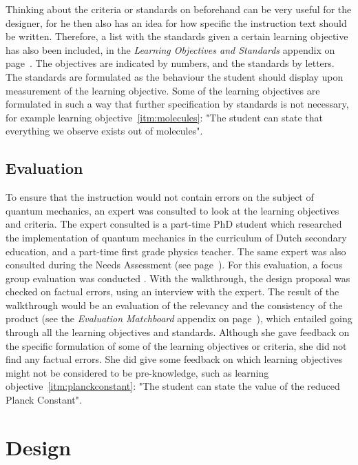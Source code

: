 \documentclass[11pt,twoside]{report} %
\begin{document}
Thinking about the criteria or standards on beforehand can be very useful for the designer, for he then also has an idea for how specific the instruction text should be written. Therefore, a list with the standards given a certain learning objective has also been included, in the \emph{Learning Objectives and Standards} appendix on page~\pageref{app:objectivestandards}. The objectives are indicated by numbers, and the standards by letters. The standards are formulated as the behaviour the student should display upon measurement of the learning objective. Some of the learning objectives are formulated in such a way that further specification by standards is not necessary, for example learning objective~\ref{itm:molecules}: "The student can state that everything we observe exists out of molecules".

\section{Evaluation}

To ensure that the instruction would not contain errors on the subject of quantum mechanics, an expert was consulted to look at the learning objectives and criteria. The expert consulted is a part-time PhD student which researched the implementation of quantum mechanics in the curriculum of Dutch secondary education, and a part-time first grade physics teacher. The same expert was also consulted during the Needs Assessment (see page~\pageref{sssec:problem}). For this evaluation, a focus group evaluation was conducted \cite{evamatchboard}. With the walkthrough, the design proposal was checked on factual errors, using an interview with the expert. The result of the walkthrough would be an evaluation of the relevancy and the consistency of the product (see the \emph{Evaluation Matchboard} appendix on page~\pageref{app:evamatchboard}), which entailed going through all the learning objectives and standards. Although she gave  feedback on the specific formulation of some of the learning objectives or criteria, she did not find any factual errors. She did give some feedback on which learning objectives might not be considered to be pre-knowledge, such as learning objective~\ref{itm:planckconstant}: "The student can state the value of the reduced Planck Constant".


\chapter{Design}
\thispagestyle{fancy}
\end{document}
